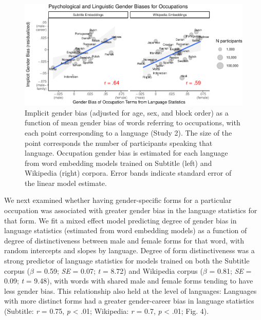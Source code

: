 \documentclass[man,floatsintext]{apa6}
\begin{document}
\begin{figure}
\centering
\includegraphics{iat_lang_pnas_files/figure-latex/unnamed-chunk-15-1.pdf}
\caption{\label{fig:unnamed-chunk-15}Implicit gender bias (adjusted for age, sex, and block order) as a function of mean gender bias of words referring to occupations, with each point corresponding to a language (Study 2). The size of the point corresponds the number of participants speaking that language. Occupation gender bias is estimated for each language from word embedding models trained on Subtitle (left) and Wikipedia (right) corpora. Error bands indicate standard error of the linear model estimate.}
\end{figure}

We next examined whether having gender-specific forms for a particular occupation was associated with greater gender bias in the language statistics for that form. We fit a mixed effect model predicting degree of gender bias in language statistics (estimated from word embedding models) as a function of degree of distinctiveness between male and female forms for that word, with random intercepts and slopes by language. Degree of form distinctiveness was a strong predictor of language statistics for models trained on both the Subtitle corpus (\(\beta\) = 0.59; \emph{SE} = 0.07; \emph{t} = 8.72) and Wikipedia corpus (\(\beta\) = 0.81; \emph{SE} = 0.09; \emph{t} = 9.48), with words with shared male and female forms tending to have less gender bias. This relationship also held at the level of languages: Languages with more distinct forms had a greater gender-career bias in language statistics (Subtitle: \emph{r} = 0.75, \emph{p} \textless{} .01; Wikipedia: \emph{r} = 0.7, \emph{p} \textless{} .01; Fig. 4).
\end{document}
